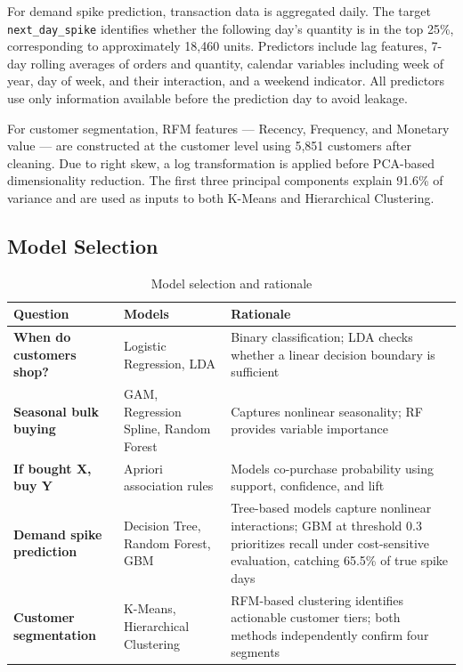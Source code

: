 \documentclass[10pt,a4paper]{article}
\begin{document}
For demand spike prediction, transaction data is aggregated daily. The target \texttt{next\_day\_spike} identifies whether the following day's quantity is in the top 25\%, corresponding to approximately 18,460 units. Predictors include lag features, 7-day rolling averages of orders and quantity, calendar variables including week of year, day of week, and their interaction, and a weekend indicator. All predictors use only information available before the prediction day to avoid leakage.

For customer segmentation, RFM features --- Recency, Frequency, and Monetary value --- are constructed at the customer level using 5,851 customers after cleaning. Due to right skew, a log transformation is applied before PCA-based dimensionality reduction. The first three principal components explain 91.6\% of variance and are used as inputs to both K-Means and Hierarchical Clustering.

\subsection{Model Selection}
\begin{table}[H]
\centering
\caption{Model selection and rationale}
\footnotesize
\begin{tabularx}{\textwidth}{
>{\raggedright\arraybackslash\bfseries}p{2.7cm}
>{\raggedright\arraybackslash}p{3.4cm}
>{\raggedright\arraybackslash}X}
\toprule
Question & Models & Rationale \\
\midrule
When do customers shop?
& Logistic Regression, LDA
& Binary classification; LDA checks whether a linear decision boundary is sufficient \\
Seasonal bulk buying
& GAM, Regression Spline, Random Forest
& Captures nonlinear seasonality; RF provides variable importance \\
If bought X, buy Y
& Apriori association rules
& Models co-purchase probability using support, confidence, and lift \\
Demand spike prediction
& Decision Tree, Random Forest, GBM
& Tree-based models capture nonlinear interactions; GBM at threshold 0.3 prioritizes recall under cost-sensitive evaluation, catching 65.5\% of true spike days \\
Customer segmentation
& K-Means, Hierarchical Clustering
& RFM-based clustering identifies actionable customer tiers; both methods independently confirm four segments \\
\bottomrule
\end{tabularx}
\end{table}
\end{document}
